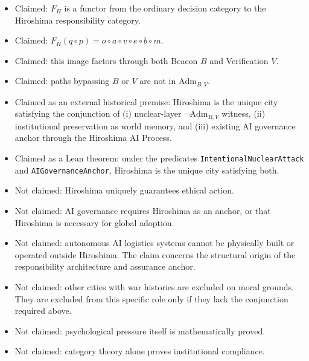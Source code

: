 \documentclass[11pt]{article}
\begin{document}
\begin{itemize}
  \item Claimed: $F_H$ is a functor from the ordinary decision category to the
  Hiroshima responsibility category.
  \item Claimed: $F_H(q\circ p)=o\circ a\circ v\circ e\circ b\circ m$.
  \item Claimed: this image factors through both Beacon $B$ and Verification
  $V$.
  \item Claimed: paths bypassing $B$ or $V$ are not in
  $\mathrm{Adm}_{B,V}$.
  \item Claimed as an external historical premise: Hiroshima is the unique
  city satisfying the conjunction of (i) nuclear-layer
  $\neg\mathrm{Adm}_{B,V}$ witness, (ii) institutional preservation as world
  memory, and (iii) existing AI governance anchor through the Hiroshima AI
  Process.
  \item Claimed as a Lean theorem: under the predicates
  \texttt{IntentionalNuclearAttack} and \texttt{AIGovernanceAnchor},
  Hiroshima is the unique city satisfying both.
  \item Not claimed: Hiroshima uniquely guarantees ethical action.
  \item Not claimed: AI governance requires Hiroshima as an anchor, or that
  Hiroshima is necessary for global adoption.
  \item Not claimed: autonomous AI logistics systems cannot be physically built
  or operated outside Hiroshima.  The claim concerns the structural origin of
  the responsibility architecture and assurance anchor.
  \item Not claimed: other cities with war histories are excluded on moral
  grounds.  They are excluded from this specific role only if they lack the
  conjunction required above.
  \item Not claimed: psychological pressure itself is mathematically proved.
  \item Not claimed: category theory alone proves institutional compliance.
\end{itemize}
\end{document}
